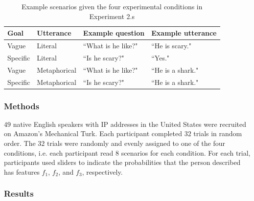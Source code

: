 \documentclass[10pt,letterpaper]{article}
\begin{document}
\begin{table}[h]
\tabcolsep=0.2cm
\small
\begin{tabular}{llll}
\toprule
Goal & Utterance & Example question & Example utterance \\
\midrule
Vague & Literal & ``What is he like?" & ``He is scary." \\
Specific  & Literal & ``Is he scary?" & ``Yes." \\
Vague & Metaphorical & ``What is he like?" & ``He is a shark." \\
Specific & Metaphorical & ``Is he scary?" & ``He is a shark." \\
\bottomrule
\end{tabular}
\caption{Example scenarios given the four experimental conditions in Experiment 2.s}
\end{table}

\subsubsection{Methods}
$49$ native English speakers with IP addresses in the United States were recruited on Amazon's Mechanical Turk. Each participant completed $32$ trials in random order. The $32$ trials were randomly and evenly assigned to one of the four conditions, i.e. each participant read $8$ scenarios for each condition. For each trial, participants used sliders to indicate the probabilities that the person described has features $f_1$, $f_2$, and $f_3$, respectively.



\subsubsection{Results}
\end{document}
